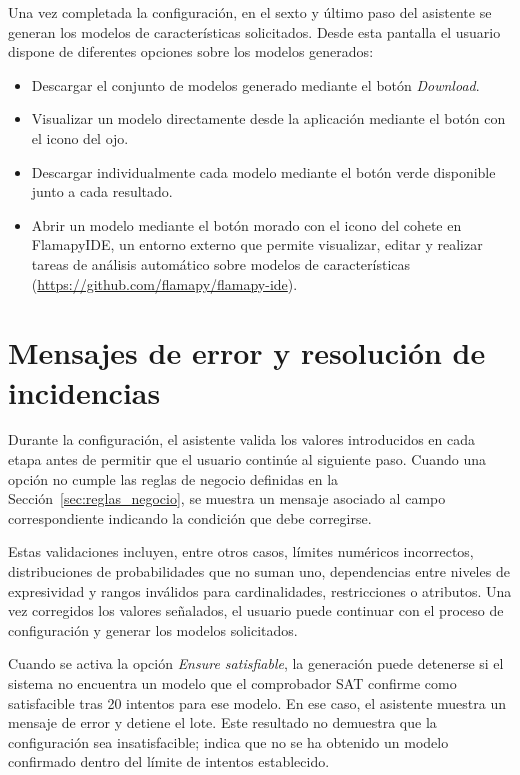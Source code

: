 Una vez completada la configuración, en el sexto y último paso del asistente se generan
los modelos de características solicitados. Desde esta pantalla el usuario
dispone de diferentes opciones sobre los modelos generados:
\begin{itemize}
    \item Descargar el conjunto de modelos generado mediante el botón
    \textit{Download}.
    \item Visualizar un modelo directamente desde la aplicación mediante el
    botón con el icono del ojo.
    \item Descargar individualmente cada modelo mediante el botón verde
    disponible junto a cada resultado.
    \item Abrir un modelo mediante el botón morado con el icono del
    cohete en FlamapyIDE, un entorno externo que permite visualizar, editar y
    realizar tareas de análisis automático sobre modelos de características
    (\url{https://github.com/flamapy/flamapy-ide}).
\end{itemize}

\section{Mensajes de error y resolución de incidencias}
\label{sec:errores}

Durante la configuración, el asistente valida los valores introducidos en cada
etapa antes de permitir que el usuario continúe al siguiente paso. Cuando una
opción no cumple las reglas de negocio definidas en la
Sección~\ref{sec:reglas_negocio}, se muestra un mensaje asociado al campo
correspondiente indicando la condición que debe corregirse.

Estas validaciones incluyen, entre otros casos, límites numéricos incorrectos,
distribuciones de probabilidades que no suman uno, dependencias entre niveles de
expresividad y rangos inválidos para cardinalidades, restricciones o atributos.
Una vez corregidos los valores señalados, el usuario puede continuar con el
proceso de configuración y generar los modelos solicitados.

Cuando se activa la opción \textit{Ensure satisfiable}, la generación puede
detenerse si el sistema no encuentra un modelo que el comprobador SAT confirme
como satisfacible tras 20 intentos para ese modelo. En ese caso, el asistente
muestra un mensaje de error y detiene el lote. Este resultado no demuestra que
la configuración sea insatisfacible; indica que no se ha obtenido un modelo
confirmado dentro del límite de intentos establecido.

